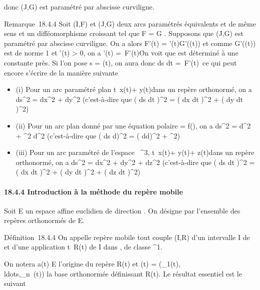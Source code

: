 \documentclass[]{article}
\begin{document}
donc (J,G) est paramétré par abscisse curviligne.

Remarque~18.4.4 Soit (I,F) et (J,G) deux arcs paramétrés équivalents et
de même sens et \theta un difféomorphisme croissant tel que F = G \cdot \theta.
Supposons que (J,G) est paramétré par abscisse curviligne. On a alors
F'(t) = \theta'(t)G'(\theta(t)) et comme G'(\theta(t)) est de norme 1 et \theta'(t)
> 0, on a \theta'(t) =\
F'(t)\. On voit que \theta est déterminé à une
constante près. Si l'on pose s = \theta(t), on aura donc  ds
\over dt =\
F'(t)\ ce qui peut encore s'écrire de la
manière suivante

\begin{itemize}
\itemsep1pt\parskip0pt
\item
  (i) Pour un arc paramétré plan
  t\mapsto~x(t)\vec\imath +
  y(t) dans un repère orthonormé, on a
  ds^2 = dx^2 + dy^2 (c'est-à-dire que
  \left ( ds \over dt
  \right )^2 = \left ( dx
  \over dt \right )^2 +
  \left ( dy \over dt
  \right )^2)
\item
  (ii) Pour un arc plan donné par une équation polaire \rho = f(\theta), on a
  ds^2 = d\rho^2 + \rho^2 d\theta^2
  (c'est-à-dire que \left ( ds \over
  d\theta \right )^2 = \left (
  d\rho \over d\theta \right )^2 +
  \rho^2)
\item
  (iii) Pour un arc paramétré de l'espace ~^3,
  t\mapsto~x(t)\vec\imath +
  y(t)\vecȷ + z(t)\veck dans un
  repère orthonormé, on a ds^2 = dx^2 +
  dy^2 + dz^2 (c'est-à-dire que
  \left ( ds \over dt
  \right )^2 = \left ( dx
  \over dt \right )^2 +
  \left ( dy \over dt
  \right )^2 + \left ( dz
  \over dt \right )^2)
\end{itemize}

\paragraph{18.4.4 Introduction à la méthode du repère mobile}

Soit E un espace affine euclidien de direction \vecE.
On désigne par  l'ensemble des repères orthonormés de E.

Définition~18.4.4 On appelle repère mobile tout couple (I,R) d'un
intervalle I de ~ et d'une application t\mapsto~R(t)
de I dans \mathcal{R}, de classe \mathcal{C}^1.

On notera a(t) \in E l'origine du repère R(t) et (t) =
(\overrightarrowe_1(t),\\ldots,\overrightarrowe_n~(t))
la base orthonormée définissant R(t). Le résultat essentiel est le
suivant
\end{document}
